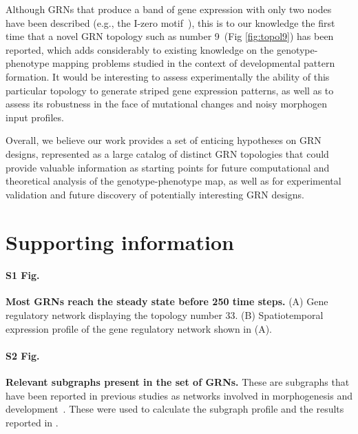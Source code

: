 \documentclass[10pt,letterpaper]{article}
\begin{document}
Although GRNs that produce a band of gene expression with only two nodes have
been described (e.g., the I-zero motif~\cite{Schaerli2014}), this is to our
knowledge the first time that a novel GRN topology such as number
9~(Fig \ref{fig:topol9}) has been reported, which adds considerably to existing
knowledge on the genotype-phenotype mapping problems studied in the
context of developmental pattern formation. It would be interesting to assess
experimentally the ability of this particular topology to generate striped gene
expression patterns, as well as to assess its robustness in the face of mutational
changes and noisy morphogen input profiles.

Overall, we believe our work provides a set of enticing hypotheses on GRN designs,
represented as a large catalog of distinct GRN topologies that could provide
valuable information as starting points for future computational and theoretical
analysis of the genotype-phenotype map, as well as for experimental validation and
future discovery of potentially interesting GRN designs.


\section*{Supporting information}


\paragraph*{S1 Fig.}
\label{S1_Fig}
{\bf Most GRNs reach the steady state before 250 time steps.}
(A) Gene regulatory network displaying the topology number 33. (B) Spatiotemporal
expression profile of the gene regulatory network shown in (A).

\paragraph*{S2 Fig.}
\label{S2_Fig}
{\bf Relevant subgraphs present in the set of GRNs.}
These are subgraphs that have been reported in previous studies as networks
involved in morphogenesis and development~\cite{Cotterell2010, Schaerli2014,
Schaerli2018}. These were used to calculate the subgraph profile and the results
reported in .
\end{document}
